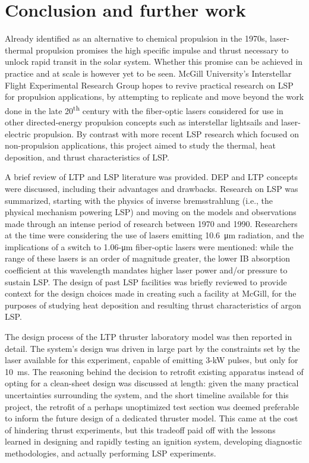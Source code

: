 \chapter{Conclusion and further work}
    Already identified as an alternative to chemical propulsion in the 1970s, laser-thermal propulsion promises the high specific impulse and thrust necessary to unlock rapid transit in the solar system. Whether this promise can be achieved in practice and at scale is however yet to be seen. McGill University's Interstellar Flight Experimental Research Group hopes to revive practical research on LSP for propulsion applications, by attempting to replicate and move beyond the work done in the late 20\textsuperscript{th} century with the fiber-optic lasers considered for use in other directed-energy propulsion concepts such as interstellar lightsails and laser-electric propulsion. By contrast with more recent LSP research which focused on non-propulsion applications, this project aimed to study the thermal, heat deposition, and thrust characteristics of LSP.

    A brief review of LTP and LSP literature was provided. DEP and LTP concepts were discussed, including their advantages and drawbacks. Research on LSP was summarized, starting with the physics of inverse bremsstrahlung (i.e., the physical mechanism powering LSP) and moving on the models and observations made through an intense period of research between 1970 and 1990. Researchers at the time were considering the use of  lasers emitting \qty{10.6}{\um} radiation, and the implications of a switch to \num{1.06}-\unit{\um} fiber-optic lasers were mentioned: while the range of these lasers is an order of magnitude greater, the lower IB absorption coefficient at this wavelength mandates higher laser power and/or pressure to sustain LSP. The design of past LSP facilities was briefly reviewed to provide context for the design choices made in creating such a facility at McGill, for the purposes of studying heat deposition and resulting thrust characteristics of argon LSP.

    The design process of the LTP thruster laboratory model was then reported in detail. The system's design was driven in large part by the constraints set by the laser available for this experiment, capable of emitting \num{3}-\unit{kW} pulses, but only for \qty{10}{ms}. The reasoning behind the decision to retrofit existing apparatus instead of opting for a clean-sheet design was discussed at length: given the many practical uncertainties surrounding the system, and the short timeline available for this project, the retrofit of a perhaps unoptimized test section was deemed preferable to inform the future design of a dedicated thruster model. This came at the cost of hindering thrust experiments, but this tradeoff paid off with the lessons learned in designing and rapidly testing an ignition system, developing diagnostic methodologies, and actually performing LSP experiments.

